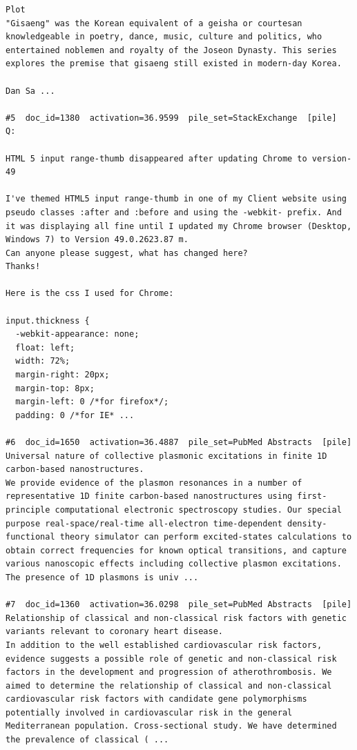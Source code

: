 \begin{verbatim}
Plot
"Gisaeng" was the Korean equivalent of a geisha or courtesan knowledgeable in poetry, dance, music, culture and politics, who entertained noblemen and royalty of the Joseon Dynasty. This series explores the premise that gisaeng still existed in modern-day Korea.

Dan Sa ...

#5  doc_id=1380  activation=36.9599  pile_set=StackExchange  [pile]
Q:

HTML 5 input range-thumb disappeared after updating Chrome to version-49

I've themed HTML5 input range-thumb in one of my Client website using pseudo classes :after and :before and using the -webkit- prefix. And it was displaying all fine until I updated my Chrome browser (Desktop, Windows 7) to Version 49.0.2623.87 m.
Can anyone please suggest, what has changed here?
Thanks!

Here is the css I used for Chrome:

input.thickness {
  -webkit-appearance: none;
  float: left;
  width: 72%;
  margin-right: 20px;
  margin-top: 8px;
  margin-left: 0 /*for firefox*/;
  padding: 0 /*for IE* ...

#6  doc_id=1650  activation=36.4887  pile_set=PubMed Abstracts  [pile]
Universal nature of collective plasmonic excitations in finite 1D carbon-based nanostructures.
We provide evidence of the plasmon resonances in a number of representative 1D finite carbon-based nanostructures using first-principle computational electronic spectroscopy studies. Our special purpose real-space/real-time all-electron time-dependent density-functional theory simulator can perform excited-states calculations to obtain correct frequencies for known optical transitions, and capture various nanoscopic effects including collective plasmon excitations. The presence of 1D plasmons is univ ...

#7  doc_id=1360  activation=36.0298  pile_set=PubMed Abstracts  [pile]
Relationship of classical and non-classical risk factors with genetic variants relevant to coronary heart disease.
In addition to the well established cardiovascular risk factors, evidence suggests a possible role of genetic and non-classical risk factors in the development and progression of atherothrombosis. We aimed to determine the relationship of classical and non-classical cardiovascular risk factors with candidate gene polymorphisms potentially involved in cardiovascular risk in the general Mediterranean population. Cross-sectional study. We have determined the prevalence of classical ( ...


\end{verbatim}
